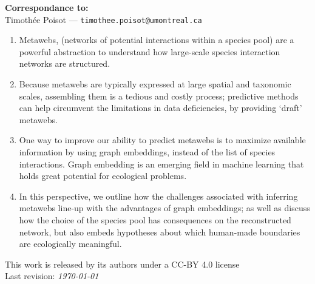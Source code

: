 \documentclass[11pt]{article}
\begin{document}
\textbf{Correspondance to:}\\
Timothée Poisot --- \texttt{timothee.poisot@umontreal.ca}\\

\vfill


\begin{enumerate}
    \item Metawebs, (networks of potential interactions within a species
pool) are a powerful abstraction to understand how large-scale species
interaction networks are structured.%
    \item Because metawebs are typically expressed at large spatial and
taxonomic scales, assembling them is a tedious and costly process;
predictive methods can help circumvent the limitations in data
deficiencies, by providing `draft' metawebs.%
    \item One way to improve our ability to predict metawebs is to
maximize available information by using graph embeddings, instead of the
list of species interactions. Graph embedding is an emerging field in
machine learning that holds great potential for ecological problems.%
    \item In this perspective, we outline how the challenges associated
with inferring metawebs line-up with the advantages of graph embeddings;
as well as discuss how the choice of the species pool has consequences
on the reconstructed network, but also embeds hypotheses about which
human-made boundaries are ecologically meaningful.%
\end{enumerate}



\vfill
This work is released by its authors under a CC-BY 4.0 license\hfill\ccby\\
Last revision: \emph{\today}

\clearpage
\thispagestyle{empty}

\vfill

\vfill

\clearpage
\linenumbers
\pagestyle{normal}
\end{document}
